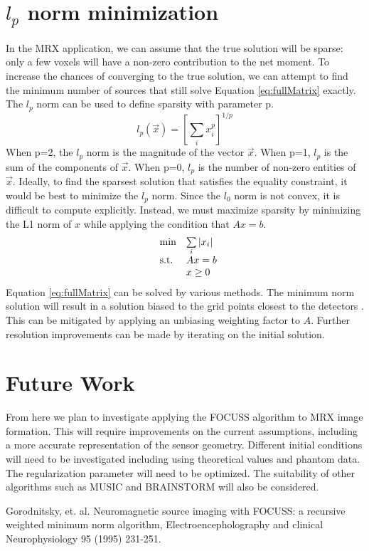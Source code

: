 \documentclass[a4paper]{article}
\begin{document}
\section{$l_{p}$ norm minimization}
In the MRX application, we can assume that the true solution will be sparse:
only a few voxels will have a non-zero contribution to the net moment.  To
increase the chances of converging to the true solution, we can attempt to
find the minimum number of sources that still solve Equation
\ref{eq:fullMatrix} exactly.  The $l_p$ norm can be used to define sparsity with parameter p.
 \begin{equation}
 l_{p}(\vec{x})=\left[\sum_{i}x_{i}^{p}\right]^{1/p} 
 \end{equation}
When p=2, the $l_{p}$ norm is the magnitude of the vector $\vec{x}$.  When p=1, $l_{p}$ is the sum of the components of $\vec{x}$.  When p=0, $l_{p}$ is the number of non-zero entities of $\vec{x}$.  Ideally, to find the sparsest solution that satisfies the equality constraint, it would be best to minimize the $l_{p}$ norm.  Since the $l_0$ norm is not convex, it is difficult to compute explicitly. Instead, we must maximize sparsity by minimizing the L1 norm of $x$ while applying the condition that $Ax = b$.
\begin{equation}
\centering
  \begin{array}{ll@{}r@{}r@{}l}
    \text{min} & \sum\limits_{i} |x_i| \\[\jot]
    \text{s.t.}& Ax = b \\
    & \multicolumn{4}{l}{x \geq 0}
  \end{array}
\end{equation}
Equation \ref{eq:fullMatrix} can be solved by various methods.  The minimum norm solution will result in a solution biased to the grid points closest to the detectors \cite{Gorodnitsky}.  This can be mitigated by applying an unbiasing weighting factor to $A$.  Further resolution improvements can be made by iterating on the initial solution.

\section{Future Work}

From here we plan to investigate applying the FOCUSS algorithm to MRX image formation.  This will require improvements on the current assumptions, including a more accurate representation of the sensor geometry.  Different initial conditions will need to be investigated including using theoretical values and phantom data.  The regularization parameter will need to be optimized. The suitability of other algorithms such as MUSIC and BRAINSTORM will also be considered.


\begin{thebibliography}{2}
 Gorodnitsky, et. al. Neuromagnetic source imaging with FOCUSS: a recursive weighted minimum norm algorithm, Electroencepholography and clinical Neurophysiology 95 (1995) 231-251.
\end{thebibliography}
\end{document}
